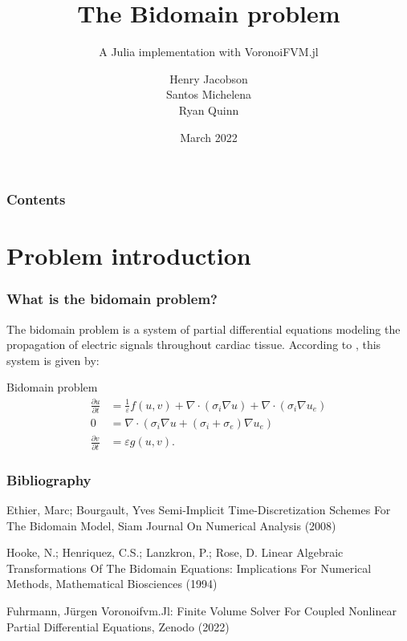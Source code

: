 \documentclass{beamer}
\title[Scientific Computing WiSe 2021/22]{The Bidomain problem}
\subtitle{A Julia implementation with VoronoiFVM.jl}
\author[{\fontsize{5.5}{6}\selectfont Henry Jacobson \& Santos Michelena \& Ryan Quinn  \hspace{5mm}}]{Henry Jacobson \\ Santos Michelena \\ Ryan Quinn} %
\institute{Technische Universität Berlin}
\date[Prof. Dr. Jürgen Fuhrmann]{March 2022}
\newcommand{\eps}{\varepsilon}
\begin{document}
\frame{\titlepage}

\begin{frame}
	\frametitle{Contents}
	\tableofcontents
\end{frame}

\section{Problem introduction}

\begin{frame}
	\frametitle{What is the bidomain problem?}
	
	The bidomain problem is a system of partial differential equations modeling the propagation of electric signals throughout cardiac tissue. \cite{intro} According to \cite{paper}, this system is given by:
	
	\begin{block}{Bidomain problem}
		\begin{align*}
			\frac{\partial u}{\partial t} &= \frac{1}{\eps}f(u,v)+
			\nabla\cdot(\sigma_i\nabla u)+\nabla\cdot(\sigma_i\nabla u_e)\\
			0&=\nabla\cdot(\sigma_i\nabla u+(\sigma_i +\sigma_e)\nabla u_e)\\
			\frac{\partial v}{\partial t} &= \eps g(u,v).
		\end{align*}
	\end{block}
	
	
	
\end{frame}



\begin{frame}
	\frametitle{Bibliography}
	
	\begin{thebibliography}{3}
		Ethier, Marc; Bourgault, Yves Semi-Implicit Time-Discretization Schemes For The Bidomain Model, Siam Journal On Numerical Analysis (2008)
		
		Hooke, N.; Henriquez, C.S.; Lanzkron, P.; Rose, D. Linear Algebraic Transformations Of The Bidomain Equations: Implications For Numerical Methods, Mathematical Biosciences (1994)
		
		Fuhrmann, Jürgen Voronoifvm.Jl: Finite Volume Solver For Coupled Nonlinear Partial Differential Equations, Zenodo (2022)
	\end{thebibliography}
	
\end{frame}
\end{document}
